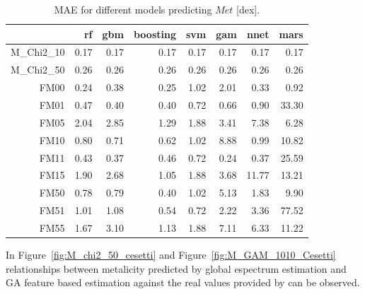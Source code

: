 \begin{table}[ht]
\centering
\begin{tabular}{rrrrrrrr}
  \hline
 & rf & gbm & boosting & svm & gam & nnet & mars \\ 
  \hline
M\_Chi2\_10 & 0.17 & 0.17 & 0.17 & 0.17 & 0.17 & 0.17 & 0.17 \\ 
  M\_Chi2\_50 & 0.26 & 0.26 & 0.26 & 0.26 & 0.26 & 0.26 & 0.26 \\ 
  FM00 & 0.24 & 0.38 & 0.25 & 1.02 & 2.01 & 0.33 & 0.92 \\ 
  FM01 & 0.47 & 0.40 & 0.40 & 0.72 & 0.66 & 0.90 & 33.30 \\ 
  FM05 & 2.04 & 2.85 & 1.29 & 1.88 & 3.41 & 7.38 & 6.28 \\ 
  FM10 & 0.80 & 0.71 & 0.62 & 1.02 & 8.88 & 0.99 & 10.82 \\ 
  FM11 & 0.43 & 0.37 & 0.46 & 0.72 & 0.24 & 0.37 & 25.59 \\ 
  FM15 & 1.90 & 2.68 & 1.05 & 1.88 & 3.68 & 11.77 & 13.21 \\ 
  FM50 & 0.78 & 0.79 & 0.40 & 1.02 & 5.13 & 1.83 & 9.90 \\ 
  FM51 & 1.01 & 1.08 & 0.54 & 0.72 & 2.22 & 3.36 & 77.52 \\ 
  FM55 & 1.67 & 3.10 & 1.13 & 1.88 & 7.11 & 6.33 & 11.22 \\
   \hline
   \end{tabular}
\caption { MAE for different models predicting $Met$ [dex].} 
\label{tab:models_M_mae} 
\end{table}
   

In Figure~\ref{fig:M_chi2_50_cesetti} and Figure~\ref{fig:M_GAM_1010_Cesetti} 
relationships between metalicity predicted by global espectrum estimation 
and GA feature based estimation against the real values
provided by \cite{2013A&A...549A.129C} can be observed.

